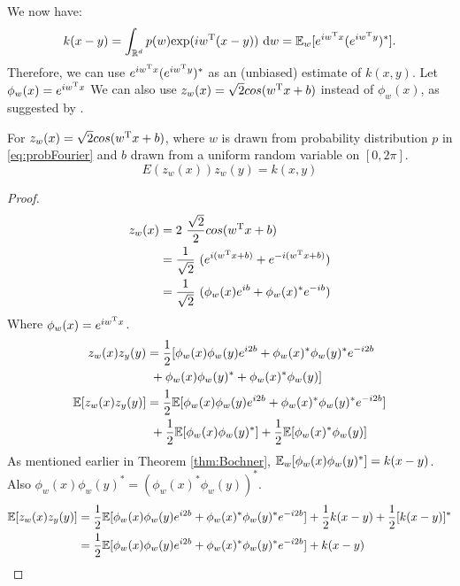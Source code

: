 \documentclass[twoside]{memoir}
\begin{document}
We now have:
\[ k(x - y) = \int_{\mathbb{R}^d} p(w) \text{exp}(iw^{\text{T}}(x - y)) ~ \text{d}w = \mathbb{E}_w[e^{iw^{\text{T}}x}(e^{iw^{\text{T}}y})^*]. \]
Therefore, we can use $e^{iw^{\text{T}}x}(e^{iw^{\text{T}}y})^*$ as an (unbiased) estimate of $k(x, y)$.
Let $\phi_w(x) = e^{iw^{\text{T}}x}$
We can also use $z_w(x) = \sqrt{2}cos(w^{\text{T}}x + b)$ instead of $\phi_w(x)$, as suggested by \cite{RFF_Rahimi}.
\begin{prop}
	For $z_w(x) = \sqrt{2}cos(w^{\text{T}}x + b)$, where $w$ is drawn from probability distribution $p$ in \eqref{eq:probFourier} and $b$ drawn from a uniform random variable on $[0, 2\pi]$.
	\[E(z_w(x))z_w(y) = k(x,y)\]
\end{prop}
\begin{proof}
	\begin{equation*}
	\begin{split}
	z_w(x) &= 2 ~ \frac{\sqrt{2}}{2}cos(w^{\text{T}}x + b) \\
	&= \frac{1}{\sqrt{2}}~(e^{i(w^{\text{T}}x+b)} + e^{-i(w^{\text{T}}x+b)}) \\
	&= \frac{1}{\sqrt{2}}~(\phi_w(x)e^{ib} + \phi_w(x)^* e^{-ib})
	\end{split}
	\end{equation*}
	Where $\phi_w(x) = e^{iw^{\text{T}}x}$.
	\begin{equation*}
	\begin{split}
	z_w(x)z_y(y) &= \frac{1}{2}[\phi_w(x)\phi_w(y)e^{i2b} + \phi_w(x)^*\phi_w(y)^*e^{-i2b} \\
	&~ + \phi_w(x)\phi_w(y)^* + \phi_w(x)^*\phi_w(y)] \\
	\mathbb{E}[z_w(x)z_y(y)] &= \frac{1}{2}\mathbb{E}[\phi_w(x)\phi_w(y)e^{i2b} + \phi_w(x)^*\phi_w(y)^*e^{-i2b}]\\
	&~ + \frac{1}{2}\mathbb{E}[\phi_w(x)\phi_w(y)^*] + \frac{1}{2}\mathbb{E}[\phi_w(x)^*\phi_w(y)] \\ 
	\end{split}
	\end{equation*}
	As mentioned earlier in Theorem \ref{thm:Bochner}, $\mathbb{E}_w[\phi_w(x)\phi_w(y)^*] = k(x - y)$.
	Also $\phi_w(x)\phi_w(y)^* = (\phi_w(x)^*\phi_w(y))^*$.
	\begin{equation*}
	\begin{split}
	\EE[z_w(x)z_y(y)] &= \frac{1}{2}\EE[\phi_w(x)\phi_w(y)e^{i2b} + \phi_w(x)^*\phi_w(y)^*e^{-i2b}]
	+ \frac{1}{2}k(x-y) + \frac{1}{2}[k(x-y)]^* \\
	&= \frac{1}{2}\EE[\phi_w(x)\phi_w(y)e^{i2b} + \phi_w(x)^*\phi_w(y)^*e^{-i2b}] + k(x-y)
	\end{split}

\end{equation*}
\end{proof}
\end{document}
